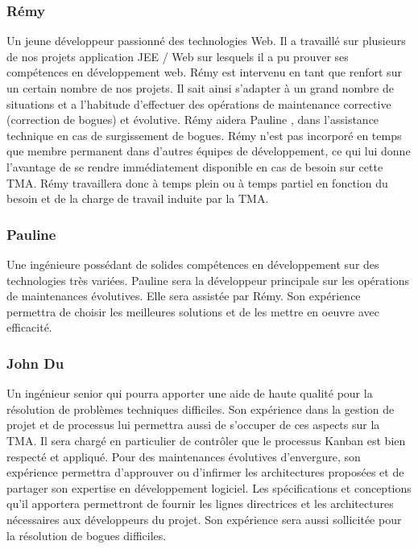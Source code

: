 \subsubsection{Rémy }
Un jeune développeur passionné des technologies Web. Il a travaillé sur plusieurs de nos projets application JEE / Web sur lesquels il a pu prouver ses compétences en développement web. Rémy est intervenu en tant que renfort sur un certain nombre de nos projets. Il sait ainsi s’adapter à un grand nombre de situations et a l’habitude d’effectuer des opérations de maintenance corrective (correction de bogues) et évolutive. Rémy  aidera Pauline , dans l’assistance technique en cas de surgissement de bogues. Rémy n’est pas incorporé en temps que membre permanent dans d’autres équipes de développement, ce qui lui donne l’avantage de se rendre immédiatement disponible en cas de besoin sur cette TMA. Rémy travaillera donc à temps plein ou à temps partiel en fonction du besoin et de la charge de travail induite par la TMA. 

\subsubsection{Pauline }
Une ingénieure possédant de solides compétences en développement sur des technologies très variées. Pauline sera la développeur principale sur les opérations de maintenances évolutives. Elle sera assistée par Rémy. Son expérience permettra de choisir les meilleures solutions et de les mettre en oeuvre avec efficacité. 

\subsubsection{John Du }
Un ingénieur senior qui pourra apporter une aide de haute qualité pour la résolution de problèmes techniques difficiles. Son expérience dans la gestion de projet et de processus lui permettra aussi de s’occuper de ces aspects sur la TMA. Il sera chargé en particulier de contrôler que le processus Kanban est bien respecté et appliqué. Pour des maintenances évolutives d’envergure, son expérience permettra d’approuver ou d’infirmer les architectures proposées et de partager son expertise en développement logiciel. Les spécifications et conceptions qu’il apportera permettront de fournir les lignes directrices et les architectures nécessaires aux développeurs du projet. Son expérience sera aussi sollicitée pour la résolution de bogues difficiles. 

